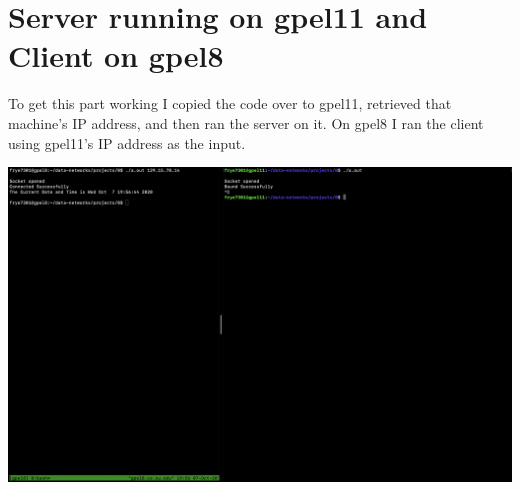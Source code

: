 \documentclass[12pt,letterpaper]{article}
\begin{document}
    \section*{Server running on gpel11 and Client on gpel8}

    To get this part working I copied the code over to gpel11, retrieved that machine's IP address, and then ran the server on it. On gpel8 I ran the client using gpel11's IP address as the input.
    
    \includegraphics[scale=0.25]{client-server-across.png}
    
\end{document}
